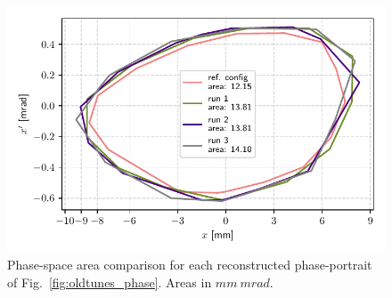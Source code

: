 \documentclass[a4paper,
               keeplastbox,   %
               ]{jacow}
\begin{document}
\begin{figure}[!h]
   \includegraphics[width=\columnwidth]{phase_areas.pdf}
   \caption{Phase-space area comparison for each reconstructed phase-portrait of Fig.~\ref{fig:oldtunes_phase}. Areas in $\unit{mm}~\unit{mrad}$.}
   \label{fig:oldtunes_areas}
\end{figure}
\end{document}
